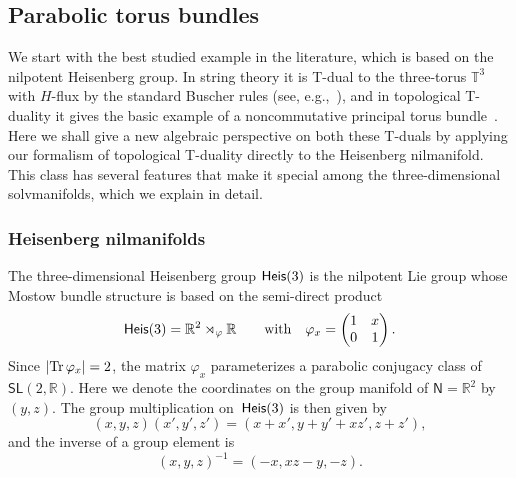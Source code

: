 \documentclass[10pt,a4paper]{amsart}
\numberwithin{equation}{section}
\newcommand{\sfN}{\mathsf{N}}
\newcommand{\sfSL}{\mathsf{SL}}
\newcommand{\Heis}{{\sf Heis}}
\newcommand{\real}{{\mathbb R}} %
\newcommand{\torus}{{\mathbb T}} %
\newcommand{\Tr}[1]{{\rm Tr}\,#1}
\begin{document}
\subsection{Parabolic torus bundles}\label{sec:parabolicbundles}

We start with the best
studied example in the literature, which is based on the nilpotent Heisenberg
group. In string theory it is T-dual to the three-torus $\torus^3$ with $H$-flux by
the standard Buscher rules (see, e.g.,~\cite{Hull2009}), and in
topological T-duality it gives the basic example of a noncommutative
principal torus
bundle~\cite{Echterhoff2009,Hannabuss2010, Mathai2004}. Here we shall give a new algebraic
perspective on
both these T-duals by applying our formalism of topological T-duality
directly to the Heisenberg nilmanifold. This class has several
features that make it special among the three-dimensional
solvmanifolds, which we explain in detail.

\subsubsection*{Heisenberg nilmanifolds}

The three-dimensional Heisenberg group $\Heis(3)$ is the nilpotent
Lie group whose Mostow bundle
structure is based on the semi-direct product
\[
\Heis(3) = \real^2\rtimes_\varphi\real \qquad \mbox{with} \quad
\varphi_x = \left( \begin{matrix}
1 & x \\
0 & 1
\end{matrix} \right) .
\]
Since $|\Tr\varphi_x|=2$, the matrix $\varphi_x$ parameterizes a
parabolic conjugacy class of $\sfSL(2,\real)$.
Here we denote the coordinates on the group manifold of $\sfN=\real^2$ by
$(y,z)$. The group multiplication on~$\Heis(3)$ is then given by
\[
(x,y,z) (x',y',z' ) = (x+x',y+y'+x z', z+z' ) ,
\]
and the inverse of a group element is
\[
(x,y,z)^{-1}= (-x,x z-y,-z) .
\]
\end{document}
